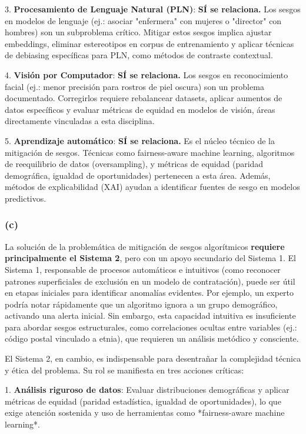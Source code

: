 \documentclass[12pt]{article}
\begin{document}
3. \textbf{Procesamiento de Lenguaje Natural (PLN)}: \textbf{SÍ se relaciona.} Los sesgos en modelos de lenguaje (ej.: asociar "enfermera" con mujeres o "director" con hombres) son un subproblema crítico. Mitigar estos sesgos implica ajustar embeddings, eliminar estereotipos en corpus de entrenamiento y aplicar técnicas de debiasing específicas para PLN, como métodos de contraste contextual.

4. \textbf{Visión por Computador}: \textbf{SÍ se relaciona.} Los sesgos en reconocimiento facial (ej.: menor precisión para rostros de piel oscura) son un problema documentado. Corregirlos requiere rebalancear datasets, aplicar aumentos de datos específicos y evaluar métricas de equidad en modelos de visión, áreas directamente vinculadas a esta disciplina.

5. \textbf{Aprendizaje automático}: \textbf{SÍ se relaciona.} Es el núcleo técnico de la mitigación de sesgos. Técnicas como fairness-aware machine learning, algoritmos de reequilibrio de datos (oversampling), y métricas de equidad (paridad demográfica, igualdad de oportunidades) pertenecen a esta área. Además, métodos de explicabilidad (XAI) ayudan a identificar fuentes de sesgo en modelos predictivos.


\subsubsection*{(c)}  

La solución de la problemática de mitigación de sesgos algorítmicos \textbf{requiere principalmente el Sistema 2}, pero con un apoyo secundario del Sistema 1. El Sistema 1, responsable de procesos automáticos e intuitivos (como reconocer patrones superficiales de exclusión en un modelo de contratación), puede ser útil en etapas iniciales para identificar anomalías evidentes. Por ejemplo, un experto podría notar rápidamente que un algoritmo ignora a un grupo demográfico, activando una alerta inicial. Sin embargo, esta capacidad intuitiva es insuficiente para abordar sesgos estructurales, como correlaciones ocultas entre variables (ej.: código postal vinculado a etnia), que requieren un análisis metódico y consciente.  

El Sistema 2, en cambio, es indispensable para desentrañar la complejidad técnica y ética del problema. Su rol se manifiesta en tres acciones críticas:  

1. \textbf{Análisis riguroso de datos}: Evaluar distribuciones demográficas y aplicar métricas de equidad (paridad estadística, igualdad de oportunidades), lo que exige atención sostenida y uso de herramientas como *fairness-aware machine learning*.  
\end{document}
